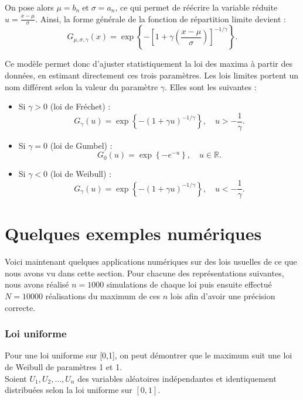 \documentclass{article}
\theoremstyle{plain}
\theoremstyle{definition}
\theoremstyle{plain}
\begin{document}
On pose alors $\mu = b_n \; \text{et} \; \sigma = a_n$, ce qui permet de réécrire la variable réduite \(u = \frac{x - \mu}{\sigma}\). Ainsi, la forme générale de la fonction de répartition limite devient :
\[
G_{\mu, \sigma, \gamma}(x) = \exp\left\{-\left[1 + \gamma \left(\frac{x - \mu}{\sigma} \right)\right]^{-1/\gamma} \right\}.
\]

Ce modèle permet donc d’ajuster statistiquement la loi des maxima à partir des données, en estimant directement ces trois paramètres. Les lois limites portent un nom différent selon la valeur du paramètre \(\gamma\).
Elles sont les suivantes :
\\
\begin{itemize}
    \item Si \(\gamma>0\) (loi de Fréchet) :
    \[
    G_\gamma(u)=\exp\left\{-\left(1+\gamma u\right)^{-1/\gamma}\right\}, \quad u > -\frac{1}{\gamma}.
    \]
    
    \item Si \(\gamma=0\) (loi de Gumbel) :
    \[
    G_0(u)=\exp\left\{-e^{-u}\right\}, \quad u\in\mathbb{R}.
    \]
    
    \item Si \(\gamma<0\) (loi de Weibull) :
    \[
    G_\gamma(u)=\exp\left\{-\left(1+\gamma u\right)^{-1/\gamma}\right\}, \quad u < -\frac{1}{\gamma}.
    \]
\end{itemize}


\newpage
\section{Quelques exemples numériques}

\noindent Voici maintenant quelques applications numériques sur des lois usuelles de ce que nous avons vu dans cette section. Pour chacune des représentations suivantes, nous avons réalisé $n=1000$ simulations de chaque loi puis ensuite effectué $N=10000$ réalisations du maximum de ces $n$ lois afin d'avoir une précision correcte. 

\subsubsection{Loi uniforme}

\noindent Pour une loi uniforme sur [0,1], on peut démontrer que le maximum suit une loi de Weibull de paramètres 1 et 1. \\
\noindent Soient \( U_1, U_2, \dots, U_n \) des variables aléatoires indépendantes et identiquement distribuées selon la loi uniforme sur \([0,1]\).
\end{document}
